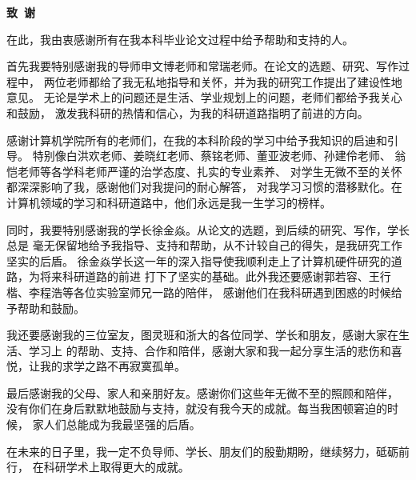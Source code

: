 \cleardoublepage{}
\begin{center}
    \bfseries {} 致~谢
\end{center}

在此，我由衷感谢所有在我本科毕业论文过程中给予帮助和支持的人。\par

首先我要特别感谢我的导师申文博老师和常瑞老师。在论文的选题、研究、写作过程中，
两位老师都给了我无私地指导和关怀，并为我的研究工作提出了建设性地意见。
无论是学术上的问题还是生活、学业规划上的问题，老师们都给予我关心和鼓励，
激发我科研的热情和信心，为我的科研道路指明了前进的方向。\par

感谢计算机学院所有的老师们，在我的本科阶段的学习中给予我知识的启迪和引导。
特别像白洪欢老师、姜晓红老师、蔡铭老师、董亚波老师、孙建伶老师、
翁恺老师等各学科老师严谨的治学态度、扎实的专业素养、
对学生无微不至的关怀都深深影响了我，感谢他们对我提问的耐心解答，
对我学习习惯的潜移默化。在计算机领域的学习和科研道路中，他们永远是我一生学习的榜样。\par

同时，我要特别感谢我的学长徐金焱。从论文的选题，到后续的研究、写作，学长总是
毫无保留地给予我指导、支持和帮助，从不计较自己的得失，是我研究工作坚实的后盾。
徐金焱学长这一年的深入指导使我顺利走上了计算机硬件研究的道路，为将来科研道路的前进
打下了坚实的基础。此外我还要感谢郭若容、王行楷、李程浩等各位实验室师兄一路的陪伴，
感谢他们在我科研遇到困惑的时候给予帮助和鼓励。\par

我还要感谢我的三位室友，图灵班和浙大的各位同学、学长和朋友，感谢大家在生活、学习上
的帮助、支持、合作和陪伴，感谢大家和我一起分享生活的悲伤和喜悦，让我的求学之路不再寂寞孤单。\par

最后感谢我的父母、家人和亲朋好友。感谢你们这些年无微不至的照顾和陪伴，
没有你们在身后默默地鼓励与支持，就没有我今天的成就。每当我困顿窘迫的时候，
家人们总能成为我最坚强的后盾。\par

在未来的日子里，我一定不负导师、学长、朋友们的殷勤期盼，继续努力，砥砺前行，
在科研学术上取得更大的成就。\par
